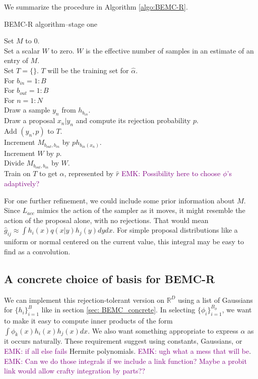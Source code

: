 \documentclass{article}
\newcommand\EMK[1]{\textcolor{purple}{EMK: #1}}
\begin{document}
We summarize the procedure in Algorithm \ref{algo:BEMC-R}.

\begin{algorithm}[h]
\caption{BEMC-R algorithm--stage one \label{algo:BEMC-R}}
Set $M$ to $0$.\\ 
Set a scalar $W$ to zero. $W$ is the effective number of samples in an estimate of an entry of $M$.\\
Set $T = \{\}$. $T$ will be the training set for $\hat{\alpha}$.\\
For $b_{in}  = 1:B$\\
\Indp
For $b_{out}  = 1:B$\\
\Indp
For $n = 1:N$\\
\Indp
Draw a sample $y_n$ from $h_{b_{in}}$.\\
Draw a proposal $x_n|y_n$ and compute its rejection probability $p$.\\
Add $(y_n, p)$ to $T$.\\
Increment $M_{b_{out}, b_{in}}$ by $ph_{b_{in}(x_n)}$.\\
Increment $W$ by $p$.\\
\Indm
Divide $M_{b_{out}, b_{in}}$ by $W$.\\
\Indm
\Indm
Train on $T$ to get $\hat{\alpha}$, represented by $\hat{r}$ \EMK{ Possibility here to choose $\phi$'s adaptively?}\\
\end{algorithm}

For one further refinement, we could include some prior information about $M$. Since $L_{acc}$ mimics the action of the sampler as it moves, it might resemble the action of the proposal alone, with no rejections. That would mean $\hat{g}_{ij} \approx \int h_i(x)q(x|y)h_j(y)dydx$. For simple proposal distributions like a uniform or normal centered on the current value, this integral may be easy to find as a convolution.

\subsection{A concrete choice of basis for BEMC-R}
\label{sec: BEMC-R_concrete}

We can implement this rejection-tolerant version on $\mathbb{R}^D$ using a list of Gaussians for $\{h_i\}_{i=1}^B$ like in section \ref{sec: BEMC_concrete}. In selecting $\{\phi_i\}_{i=1}^{B_\phi}$, we want to make it easy to compute inner products of the form $\int \phi_k(x)h_i(x)h_j(x)dx$. We also want something appropriate to express $\alpha$ as it occurs naturally. These requirement suggest using constants, Gaussians, or \EMK{if all else fails} Hermite polynomials. \EMK{ugh what a mess that will be}. \EMK{Can we do those integrals if we include a link function? Maybe a probit link would allow crafty integration by parts??}
\end{document}
